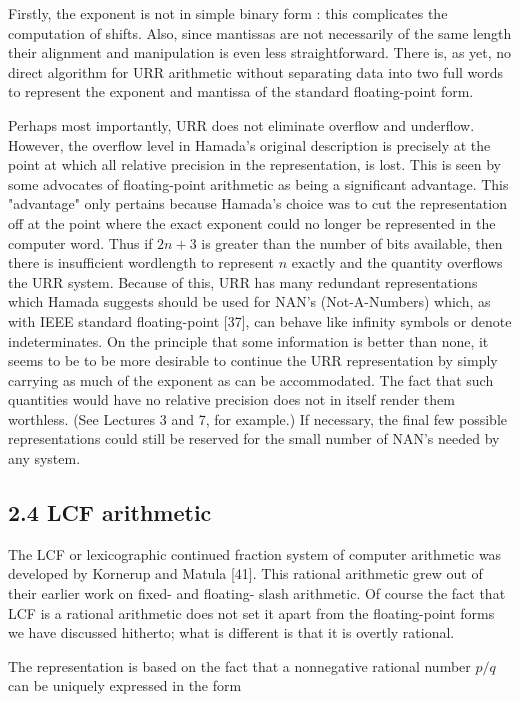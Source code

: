 \documentclass[10pt]{article}
\begin{document}
Firstly, the exponent is not in simple binary form : this complicates the computation of shifts. Also, since mantissas are not necessarily of the same length their alignment and manipulation is even less straightforward. There is, as yet, no direct algorithm for URR arithmetic without separating data into two full words to represent the exponent and mantissa of the standard floating-point form.

Perhaps most importantly, URR does not eliminate overflow and underflow. However, the overflow level in Hamada's original description is precisely at the point at which all relative precision in the representation, is lost. This is seen by some advocates of floating-point arithmetic as being a significant advantage. This "advantage" only pertains because Hamada's choice was to cut the representation off at the point where the exact exponent could no longer be represented in the computer word. Thus if $2 n+3$ is greater than the number of bits available, then there is insufficient wordlength to represent $n$ exactly and the quantity overflows the URR system. Because of this, URR has many redundant representations which Hamada suggests should be used for NAN's (Not-A-Numbers) which, as with IEEE standard floating-point [37], can behave like infinity symbols or denote indeterminates. On the principle that some information is better than none, it seems to be to be more desirable to continue the URR representation by simply\\
carrying as much of the exponent as can be accommodated. The fact that such quantities would have no relative precision does not in itself render them worthless. (See Lectures 3 and 7, for example.) If necessary, the final few possible representations could still be reserved for the small number of NAN's needed by any system.

\subsection*{2.4 LCF arithmetic}
The LCF or lexicographic continued fraction system of computer arithmetic was developed by Kornerup and Matula [41]. This rational arithmetic grew out of their earlier work on fixed- and floating- slash arithmetic. Of course the fact that LCF is a rational arithmetic does not set it apart from the floating-point forms we have discussed hitherto; what is different is that it is overtly rational.

The representation is based on the fact that a nonnegative rational number $p / q$ can be uniquely expressed in the form
\end{document}
